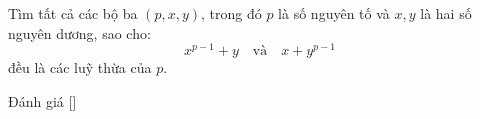 \ifshowproblem
\begin{problem}\label{problem:FRA-2015-TST4-P9}
    Tìm tất cả các bộ ba \( (p, x, y) \), trong đó \( p \) là số nguyên tố và \( x, y \) là hai số nguyên dương, sao cho:
    \[
        x^{p-1} + y \quad \text{và} \quad x + y^{p-1}
    \]
    đều là các luỹ thừa của \( p \).
\end{problem}
\fi

\ifshowinfo
Đánh giá [\textbf{}]
\fi